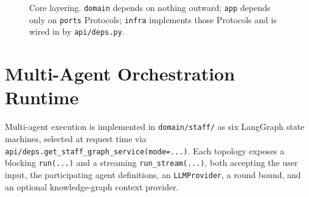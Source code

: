 \documentclass[conference]{IEEEtran}
\begin{document}
\begin{figure}[t]
\centering
{}
\caption{Core layering. \texttt{domain} depends on nothing outward;
\texttt{app} depends only on \texttt{ports} Protocols; \texttt{infra}
implements those Protocols and is wired in by \texttt{api/deps.py}.}
\label{fig:layers}
\end{figure}

\section{Multi-Agent Orchestration Runtime}
\label{sec:orchestration}

Multi-agent execution is implemented in \texttt{domain/staff/} as six
LangGraph state machines, selected at request time via
\texttt{api/deps.get\_staff\_graph\_service(mode=...)}. Each topology
exposes a blocking \texttt{run(...)} and a streaming
\texttt{run\_stream(...)}, both accepting the user input, the participating
agent definitions, an \texttt{LLMProvider}, a round bound, and an optional
knowledge-graph context provider.
\end{document}
